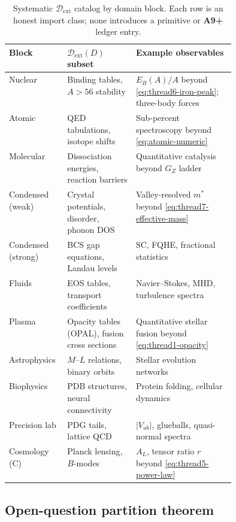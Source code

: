 \begin{table}[ht]
\centering
\small
\renewcommand{\arraystretch}{1.10}
\begin{tabular}{@{}llp{0.44\linewidth}@{}}
\toprule
\textbf{Block} & \textbf{$\mathcal{D}_{\mathrm{ext}}(D)$ subset} &
  \textbf{Example observables} \\
\midrule
Nuclear &
  Binding tables, $A>56$ stability &
  $E_B(A)/A$ beyond \eqref{eq:thread6-iron-peak}; three-body forces \\
Atomic &
  QED tabulations, isotope shifts &
  Sub-percent spectroscopy beyond \eqref{eq:atomic-numeric} \\
Molecular &
  Dissociation energies, reaction barriers &
  Quantitative catalysis beyond $G_Z$ ladder \\
Condensed (weak) &
  Crystal potentials, disorder, phonon DOS &
  Valley-resolved $m^*$ beyond \eqref{eq:thread7-effective-mass} \\
Condensed (strong) &
  BCS gap equations, Landau levels &
  SC, FQHE, fractional statistics \\
Fluids &
  EOS tables, transport coefficients &
  Navier--Stokes, MHD, turbulence spectra \\
Plasma &
  Opacity tables (OPAL), fusion cross sections &
  Quantitative stellar fusion beyond \eqref{eq:thread1-opacity} \\
Astrophysics &
  $M$--$L$ relations, binary orbits &
  Stellar evolution networks \\
Biophysics &
  PDB structures, neural connectivity &
  Protein folding, cellular dynamics \\
Precision lab &
  PDG tails, lattice QCD &
  $|V_{ub}|$, glueballs, quasi-normal spectra \\
Cosmology (C) &
  Planck lensing, $B$-modes &
  $A_L$, tensor ratio $r$ beyond \eqref{eq:thread5-power-law} \\
\bottomrule
\end{tabular}
\caption{Systematic $\mathcal{D}_{\mathrm{ext}}$ catalog by domain block.
Each row is an honest import class; none introduces a primitive or
\textbf{A9+} ledger entry.}
\label{tab:thread-9-dext-catalog}
\end{table}

\subsection{Open-question partition theorem}
\label{sec:wave6-thread9:partition}

